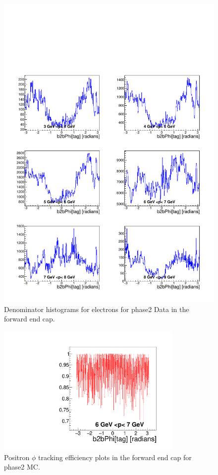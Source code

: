 \documentclass[a4paper,11pt,twosided,final,german,openbib,pdftex,listof=totoc,bibliography=totoc]{scrbook}
\begin{document}
\begin{appendix}
\begin{figure}[!htbp]
	\centering
	\includegraphics[width=\textwidth]{Plots/master/xPMPhiemFCD_Data}
	\caption[Momentum $\phi$ Electron Forward End Cap Denominator Histogram Phase2 Data]{Denominator histograms for electrons for phase2 Data in the forward end cap.}
	\label{plt:PMPhiemFCD_Data}
\end{figure}



\begin{figure}[!htbp]
	\centering
	\includegraphics[width=9cm]{Plots/master/xPMPhiepFC_MC}
	\caption[Momentum $\phi$ Positron Forward End Cap Efficiency Phase2 MC]{Positron $\phi$ tracking efficiency plots in the forward end cap for phase2 MC.}
	\label{plt:PMPhiepFC_MC}
\end{figure}



\end{appendix}
\end{document}

